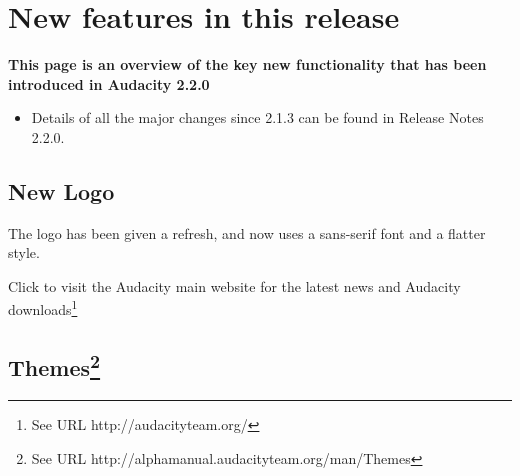 

		
			
												

				
\chapter{New features in this release}

\label{f0}								

				

\textbf{This page is an overview of the key new functionality that has been introduced in Audacity 2.2.0}

\begin{itemize}
\item  
Details of all the major changes since 2.1.3 can be found in Release Notes 2.2.0.


\end{itemize}


\section{
New Logo
}


The logo has been given a refresh, and now uses a sans-serif font and a flatter style.

Click to visit the Audacity main website for  the latest news and Audacity downloads\footnote{See URL http://audacityteam.org/}


\section{
Themes\protect\footnote{See URL http://alphamanual.audacityteam.org/man/Themes}
}


